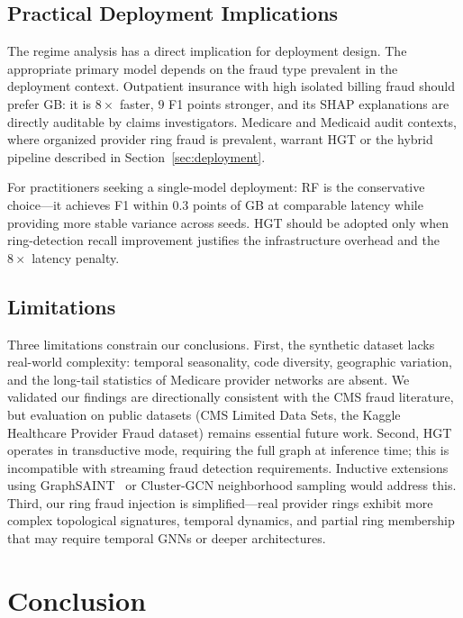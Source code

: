 \documentclass[pdflatex,sn-mathphys-num]{sn-jnl}
\theoremstyle{thmstyleone}
\theoremstyle{thmstyletwo}
\theoremstyle{thmstylethree}
\begin{document}
\subsection{Practical Deployment Implications}

The regime analysis has a direct implication for deployment design. The
appropriate primary model depends on the fraud type prevalent in the
deployment context. Outpatient insurance with high isolated billing
fraud should prefer GB: it is $8\times$ faster, $9$ F1 points stronger,
and its SHAP explanations are directly auditable by claims
investigators. Medicare and Medicaid audit contexts, where organized
provider ring fraud is prevalent, warrant HGT or the hybrid pipeline
described in Section~\ref{sec:deployment}.

For practitioners seeking a single-model deployment: RF is the
conservative choice---it achieves F1 within $0.3$ points of GB at
comparable latency while providing more stable variance across seeds.
HGT should be adopted only when ring-detection recall improvement
justifies the infrastructure overhead and the $8\times$ latency penalty.

\subsection{Limitations}

Three limitations constrain our conclusions. First, the synthetic
dataset lacks real-world complexity: temporal seasonality, code
diversity, geographic variation, and the long-tail statistics of
Medicare provider networks are absent. We validated our findings are
directionally consistent with the CMS fraud literature, but evaluation
on public datasets (CMS Limited Data Sets, the Kaggle Healthcare
Provider Fraud dataset) remains essential future work. Second, HGT
operates in transductive mode, requiring the full graph at inference
time; this is incompatible with streaming fraud detection requirements.
Inductive extensions using GraphSAINT~\cite{zeng2020} or Cluster-GCN
neighborhood sampling would address this. Third, our ring fraud
injection is simplified---real provider rings exhibit more complex
topological signatures, temporal dynamics, and partial ring membership
that may require temporal GNNs or deeper architectures.

\section{Conclusion}\label{sec:conclusion}
\end{document}
